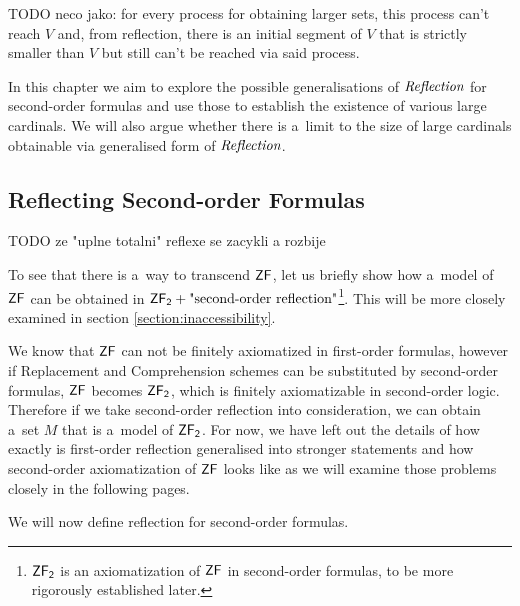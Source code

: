 \documentclass[12pt,a4paper]{article}
\begin{document}
TODO neco jako: for every process for obtaining larger sets, this process can't reach $V$ and, from reflection, there is an initial segment of $V$ that is strictly smaller than $V$ but still can't be reached via said process.

In this chapter we aim to explore the possible generalisations of $\emph{Reflection}$ for second-order formulas and use those to establish the existence of various large cardinals. We will also argue whether there is a~limit to the size of large cardinals obtainable via generalised form of $\emph{Reflection}$. 

\subsection{Reflecting Second-order Formulas}


TODO ze "uplne totalni" reflexe se zacykli a rozbije

To see that there is a~way to transcend $\sf{ZF}$, let us briefly show how a~model of $\sf{ZF}$ can be obtained in $\sf{ZF}_2 + \mbox{"second-order reflection"}$\footnote{$\sf{ZF}_2$ is an axiomatization of $\sf{ZF}$ in second-order formulas, to be more rigorously established later.}. This will be more closely examined in section \ref{section:inaccessibility}.

We know that $\sf{ZF}$ can not be finitely axiomatized in first-order formulas, however if Replacement and Comprehension schemes can be substituted by second-order formulas, $\sf{ZF}$ becomes $\sf{ZF}_2$, which is finitely axiomatizable in second-order logic. Therefore if we take second-order reflection into consideration, we can obtain a~set $M$ that is a~model of $\sf{ZF}_2$. For now, we have left out the details of how exactly is first-order reflection generalised into stronger statements and how second-order axiomatization of $\sf{ZF}$ looks like as we will examine those problems closely in the following pages. 

We will now define reflection for second-order formulas.
\end{document}
